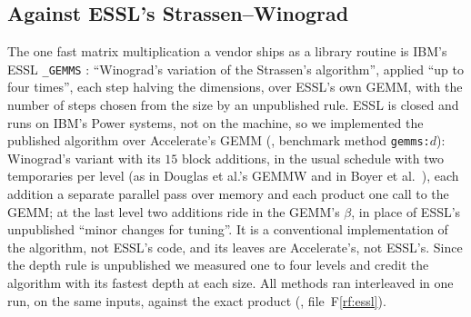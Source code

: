 \documentclass[11pt]{article}
\newcommand{\rf}[1]{F\ref{rf:#1}}
\begin{document}
\subsection{Against ESSL's Strassen--Winograd}\label{sec:essl}

The one fast matrix multiplication a vendor ships as a library routine is
IBM's ESSL \texttt{\_GEMMS} \cite{ESSL}: ``Winograd's variation of the
Strassen's algorithm'', applied ``up to four times'', each step halving the
dimensions, over ESSL's own GEMM, with the number of steps chosen from the
size by an unpublished rule.  ESSL is closed and runs on IBM's Power systems,
not on the machine, so we implemented the published algorithm over
Accelerate's GEMM (, benchmark method
\texttt{gemms:}$d$): Winograd's variant with its $15$ block additions, in the
usual schedule with two temporaries per level (as in Douglas et al.'s GEMMW
\cite{DHSS94} and in Boyer et al.\ \cite{BDPZ09}), each addition a
separate parallel pass over memory and each product one call to the GEMM;
at the last level two additions ride in the GEMM's $\beta$, in place of
ESSL's unpublished ``minor changes for tuning''.  It is a conventional
implementation of the algorithm, not ESSL's code, and its leaves are
Accelerate's, not ESSL's.  Since the depth rule is unpublished we measured
one to four levels and credit the algorithm with its fastest depth at each
size.  All methods ran interleaved in one run, on the same inputs, against
the exact product (, file~\rf{essl}).
\end{document}
